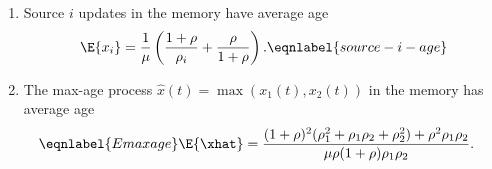 \documentclass[conference, 10pt]{IEEEtran}
\newcommand{\Qcal}{\mathcal{Q}}
\newcommand{\lam}{\lambda}
\newcommand{\maxage}{\hat{x}}
\newcommand{\RY}[1]{\quad {\color{red} #1} \quad}
\begin{document}
\begin{theorem}\label{thm:age-exp}
\mbox{}
\begin{enumerate}
\item[(a)] Source $i$ updates in the memory have average age
\begin{align}
    \E{x_i} = \frac{1}{\mu}\left(\frac{1+\rho}{\rho_i} + \frac{\rho}{1+
    \rho}\right).
    \eqnlabel{source-i-age}
\end{align}
\item[(b)] The max-age process $\hat{x}(t)=\max(x_1(t), x_2(t))$ in the memory has average age
\begin{align}\eqnlabel{Emaxage}
\E{\xhat}&=\frac{(1+\rho)^2(\rho_1^2+\rho_1\rho_2+\rho_2^2)+\rho^2\rho_1\rho_2}{\mu\rho(1+\rho)\rho_1\rho_2}.
\end{align}
\end{enumerate}
\end{theorem}
\end{document}
